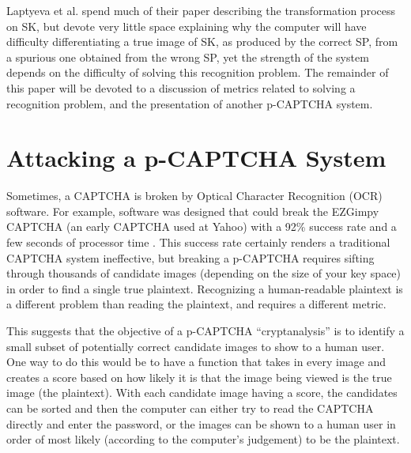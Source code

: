 \documentclass[12pt]{article}
\begin{document}
Laptyeva et al. spend much of their paper describing the transformation process on SK, but devote very little space explaining why the computer will have difficulty differentiating a true image of SK, as produced by the correct SP, from a spurious one obtained from the wrong SP, yet the strength of the system depends on the difficulty of solving this recognition problem. The remainder of this paper will be devoted to a discussion of metrics related to solving a recognition problem, and the presentation of another p-CAPTCHA system.

\section*{Attacking a p-CAPTCHA System}
Sometimes, a CAPTCHA is broken by Optical Character Recognition (OCR) software. For example, software was designed that could break the EZGimpy CAPTCHA (an early CAPTCHA used at Yahoo) with a 92\% success rate and a few seconds of processor time \cite{mori}. This success rate certainly renders a traditional CAPTCHA system ineffective, but breaking a p-CAPTCHA requires sifting through thousands of candidate images (depending on the size of your key space) in order to find a single true plaintext. Recognizing a human-readable plaintext is a different problem than reading the plaintext, and requires a different metric.

This suggests that the objective of a p-CAPTCHA “cryptanalysis” is to identify a small subset of potentially correct candidate images to show to a human user. One way to do this would be to have a function that takes in every image and creates a score based on how likely it is that the image being viewed is the true image (the plaintext). With each candidate image having a score, the candidates can be sorted and then the computer can either try to read the CAPTCHA directly and enter the password, or the images can be shown to a human user in order of most likely (according to the computer's judgement) to be the plaintext.
\end{document}
